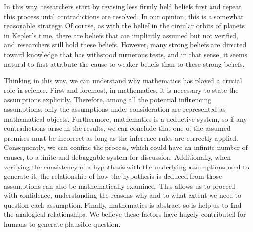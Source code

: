 In this way, researchers start by revising less firmly held beliefs first and repeat this process until contradictions are resolved. In our opinion, this is a somewhat reasonable strategy. Of course, as with the belief in the circular orbits of planets in Kepler's time, there are beliefs that are implicitly assumed but not verified, and researchers still hold these beliefs. However, many strong beliefs are directed toward knowledge that has withstood numerous tests, and in that sense, it seems natural to first attribute the cause to weaker beliefs than to these strong beliefs.

Thinking in this way, we can understand why mathematics has played a crucial role in science. First and foremost, in mathematics, it is necessary to state the assumptions explicitly. Therefore, among all the potential influencing assumptions, only the assumptions under consideration are represented as mathematical objects. Furthermore, mathematics is a deductive system, so if any contradictions arise in the results, we can conclude that one of the assumed premises must be incorrect as long as the inference rules are correctly applied. Consequently, we can confine the process, which could have an infinite number of causes, to a finite and debuggable system for discussion. Additionally, when verifying the consistency of a hypothesis with the underlying assumptions used to generate it, the relationship of how the hypothesis is deduced from those assumptions can also be mathematically examined. This allows us to proceed with confidence, understanding the reasons why and to what extent we need to question each assumption. Finally, mathematics is abstract so is help us to find the analogical relationships. We believe these factors have hugely contributed for humans to generate plausible question.




